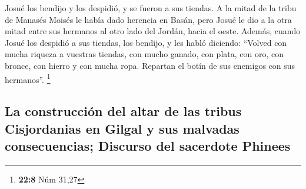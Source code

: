  Josué los bendijo y los despidió, y se fueron a sus
tiendas.  A la mitad de la tribu de Manasés Moisés le
había dado herencia en Basán, pero Josué le dio a la otra mitad entre
sus hermanos al otro lado del Jordán, hacia el oeste. Además, cuando
Josué los despidió a sus tiendas, los bendijo,  y les
habló diciendo: ``Volved con mucha riqueza a vuestras tiendas, con mucho
ganado, con plata, con oro, con bronce, con hierro y con mucha ropa.
Repartan el botín de sus enemigos con sus hermanos''. \footnote{\textbf{22:8}
  Núm 31,27}

\hypertarget{la-construcciuxf3n-del-altar-de-las-tribus-cisjordanias-en-gilgal-y-sus-malvadas-consecuencias-discurso-del-sacerdote-phinees}{%
\subsection{La construcción del altar de las tribus Cisjordanias en
Gilgal y sus malvadas consecuencias; Discurso del sacerdote
Phinees}\label{la-construcciuxf3n-del-altar-de-las-tribus-cisjordanias-en-gilgal-y-sus-malvadas-consecuencias-discurso-del-sacerdote-phinees}}

